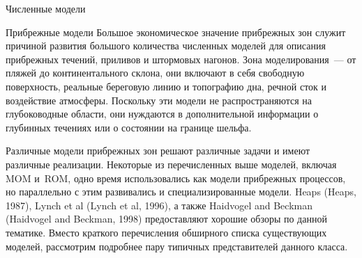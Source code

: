 \begin{chapter}{Численные модели}
\begin{section}{Прибрежные модели}
Большое экономическое значение прибрежных зон служит причиной развития
большого количества численных моделей для описания прибрежных течений,
приливов и штормовых нагонов. Зона моделирования~--- от пляжей до
континентального склона, они включают в себя свободную поверхность,
реальные береговую линию и топографию дна, речной сток и воздействие
атмосферы. Поскольку эти модели не распространяются на глубоководные
области, они нуждаются в дополнительной информации о глубинных
течениях или о состоянии на границе шельфа.
%

Различные модели прибрежных зон решают различные задачи и имеют
различные реализации. Некоторые из перечисленных выше моделей, включая
MOM и~ROM, одно время использовались как модели прибрежных
процессов, но параллельно с этим развивались и специализированные
модели. Heaps (Heaps, 1987), Lynch et al (Lynch et al, 1996), 
а также Haidvogel and Beckman (Haidvogel and Beckman, 1998)
предоставляют хорошие обзоры по данной тематике. Вместо краткого перечисления
обширного списка существующих моделей, рассмотрим подробнее пару типичных
представителей данного класса.
%


\end{section}
\end{chapter}
